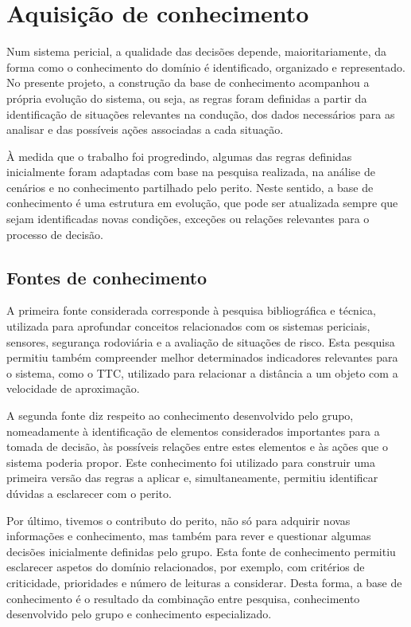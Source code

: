 \chapter{Aquisição de conhecimento}
\label{cap:aquisicao}

Num sistema pericial, a qualidade das decisões depende, maioritariamente, da
forma como o conhecimento do domínio é identificado, organizado e
representado. No presente projeto, a construção da base de conhecimento
acompanhou a própria evolução do sistema, ou seja, as regras foram definidas a
partir da identificação de situações relevantes na condução, dos dados
necessários para as analisar e das possíveis ações associadas a cada
situação.

À medida que o trabalho foi progredindo, algumas das regras definidas
inicialmente foram adaptadas com base na pesquisa realizada, na análise de
cenários e no conhecimento partilhado pelo perito. Neste sentido, a base de
conhecimento é uma estrutura em evolução, que pode ser atualizada sempre que
sejam identificadas novas condições, exceções ou relações relevantes para o
processo de decisão.

\section{Fontes de conhecimento}
\label{sec:fontes}

A primeira fonte considerada corresponde à pesquisa bibliográfica e técnica,
utilizada para aprofundar conceitos relacionados com os sistemas periciais,
sensores, segurança rodoviária e a avaliação de situações de risco. Esta
pesquisa permitiu também compreender melhor determinados indicadores
relevantes para o sistema, como o TTC, utilizado
para relacionar a distância a um objeto com a velocidade de aproximação.

A segunda fonte diz respeito ao conhecimento desenvolvido pelo grupo,
nomeadamente à identificação de elementos considerados importantes para a
tomada de decisão, às possíveis relações entre estes elementos e às ações que
o sistema poderia propor. Este conhecimento foi utilizado para construir uma
primeira versão das regras a aplicar e, simultaneamente, permitiu identificar
dúvidas a esclarecer com o perito.

Por último, tivemos o contributo do perito, não só para adquirir novas
informações e conhecimento, mas também para rever e questionar algumas
decisões inicialmente definidas pelo grupo. Esta fonte de conhecimento
permitiu esclarecer aspetos do domínio relacionados, por exemplo, com
critérios de criticidade, prioridades e número de leituras a considerar.
Desta forma, a base de conhecimento é o resultado da combinação entre
pesquisa, conhecimento desenvolvido pelo grupo e conhecimento especializado.

